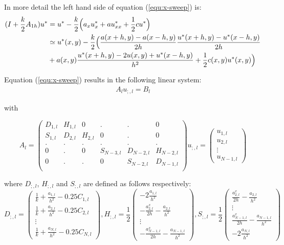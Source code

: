 \documentclass[12pt]{article}
\begin{document}
In more detail the left hand side of equation (\ref{equ:x-sweep}) is:
\begin{align*}
(I +\frac{k}{2}A_{1h})u^* &= u^* -\frac{k}{2}\Bigl( a_x u^*_x + a u^*_{xx} +
\frac{1}{2} c u^*\Bigr) \nonumber \\
&\simeq  u^*(x,y) -\frac{k}{2}\Bigl( \frac{a(x+h, y) - a(x-h,y)}{2h}
\frac{u^*(x+h, y)- u^*(x-h,y)}{2h} \\
& + a(x,y) \frac{u^*(x+h,y) - 2 u(x,y) + u^*(x-h,y) }{h^2}
+ \frac{1}{2} c(x,y) u^*(x,y)
\Bigr)
\end{align*}



Equation (\ref{equ:x-sweep}) results in the following linear system:
\begin{eqnarray}
  A_l u_{;,l} = B_l
  \label{equ:xsweep_lin}
\end{eqnarray}



with
 
\[ A_l = \left( \begin{array}{cccccc}
D_{1,l} & H_{1,l} & 0 & . & . & 0\\
S_{1,l} & D_{2,l} & H_{2,l} & 0 & . & 0 \\
. & . & . & . & .& . \\
0 & . & 0 & S_{N-3,l} & D_{N-2,l} & H_{N-2,l}\\
0 & . & . & 0 & S_{N-2,l} & D_{N-1,l}\\
\end{array} \right)
%
u_{;,l} = \left( \begin{array}{c}
  u_{1,l} \\
  u_{2,l} \\
  \vdots \\
  u_{N-1,l}
   \end{array}
\right)
\]


where $D_{;,l}$, $H_{;,l}$ and $S_{;,l}$ are defined as follows respectively: 
\[ D_{;,l} = \left( \begin{array}{c}
  \frac{1}{k} + \frac{a_{1,l}}{h^2} - 0.25 C_{1,l} \\
  \frac{1}{k} + \frac{a_{2,l}}{h^2} - 0.25 C_{2,l} \\
  \vdots \\
  \frac{1}{k} + \frac{a_{N,l}}{h^2} - 0.25 C_{N,l}
  \end{array} \right),
%
 H_{;,l} = \frac{1}{2}\left( \begin{array}{c}
  -2\frac{a_{1,l}}{h^2} \\
  -\frac{a^x_{2,l}}{2h} - \frac{a_{2,l}}{h^2} \\
  \vdots \\
  -\frac{a^x_{N-1,l}}{2h} - \frac{a_{N-1,l}}{h^2}
   \end{array}
\right),  
%
S_{;,l} = \frac{1}{2} \left( \begin{array}{c}
  \frac{a^x_{2,l}}{2h} - \frac{a_{2,l}}{h^2} \\
  \vdots \\
  \frac{a^x_{N-1,l}}{2h} - \frac{a_{N-1,l}}{h^2} \\
  -2\frac{a_{N, l}}{h^2}
  
   \end{array}
\right)\]
\end{document}

